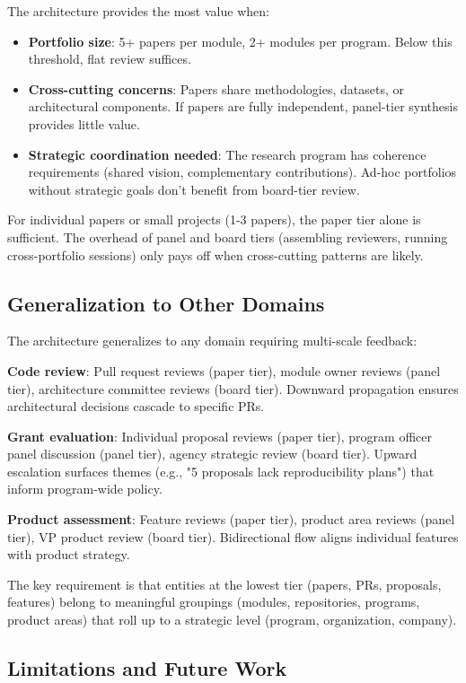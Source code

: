 The architecture provides the most value when:
\begin{itemize}
\item \textbf{Portfolio size}: 5+ papers per module, 2+ modules per program. Below this threshold, flat review suffices.
\item \textbf{Cross-cutting concerns}: Papers share methodologies, datasets, or architectural components. If papers are fully independent, panel-tier synthesis provides little value.
\item \textbf{Strategic coordination needed}: The research program has coherence requirements (shared vision, complementary contributions). Ad-hoc portfolios without strategic goals don't benefit from board-tier review.
\end{itemize}

For individual papers or small projects (1-3 papers), the paper tier alone is sufficient. The overhead of panel and board tiers (assembling reviewers, running cross-portfolio sessions) only pays off when cross-cutting patterns are likely.

\subsection{Generalization to Other Domains}

The architecture generalizes to any domain requiring multi-scale feedback:

\textbf{Code review}: Pull request reviews (paper tier), module owner reviews (panel tier), architecture committee reviews (board tier). Downward propagation ensures architectural decisions cascade to specific PRs.

\textbf{Grant evaluation}: Individual proposal reviews (paper tier), program officer panel discussion (panel tier), agency strategic review (board tier). Upward escalation surfaces themes (e.g., "5 proposals lack reproducibility plans") that inform program-wide policy.

\textbf{Product assessment}: Feature reviews (paper tier), product area reviews (panel tier), VP product review (board tier). Bidirectional flow aligns individual features with product strategy.

The key requirement is that entities at the lowest tier (papers, PRs, proposals, features) belong to meaningful groupings (modules, repositories, programs, product areas) that roll up to a strategic level (program, organization, company).

\subsection{Limitations and Future Work}

